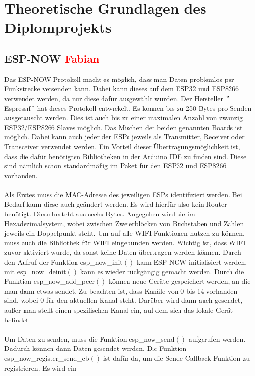 \documentclass[titlepage,12pt,twoside]{article}
\begin{document}
\section{Theoretische Grundlagen des Diplomprojekts}

\subsection{ESP-NOW \textcolor{red}{Fabian}}
Das ESP-NOW Protokoll macht es möglich, dass man Daten problemlos per 
Funkstrecke versenden kann. Dabei kann dieses auf dem ESP32 und ESP8266 
verwendet werden, da nur diese dafür ausgewählt wurden. Der Hersteller 
$"$Espressif$"$ hat dieses Protokoll entwickelt. Es können bis zu 250 Bytes 
pro Senden ausgetauscht werden. Dies ist auch bis zu einer maximalen Anzahl 
von zwanzig ESP32/ESP8266 Slaves möglich. Das Mischen der beiden genannten 
Boards ist möglich. Dabei kann auch jeder der ESPs jeweils als Transmitter, 
Receiver oder Transceiver verwendet werden. Ein Vorteil dieser Übertragungsmöglichkeit 
ist, dass die dafür benötigten Bibliotheken in der Arduino IDE zu finden 
sind. Diese sind nämlich schon standardmäßig im Paket für den ESP32 und 
ESP8266 vorhanden. \\
\\
Als Erstes muss die MAC-Adresse des jeweiligen ESPs identifiziert werden. 
Bei Bedarf kann diese auch geändert werden. Es wird hierfür also kein 
Router benötigt. Diese besteht aus sechs Bytes. Angegeben wird sie im 
Hexadezimalsystem, wobei zwischen Zweierblöcken von Buchstaben und Zahlen 
jeweils ein Doppelpunkt steht. Um auf alle WIFI-Funktionen nutzen zu können, 
muss auch die Bibliothek für WIFI eingebunden werden. Wichtig ist, dass WIFI 
zuvor aktiviert wurde, da sonst keine Daten übertragen werden können. Durch 
den Aufruf der Funktion esp\_now\_init$()$ kann ESP-NOW initialisiert werden, 
mit esp\_now\_deinit$()$ kann es wieder rückgängig gemacht werden. Durch die 
Funktion esp\_now\_add\_peer$()$ können neue Geräte gespeichert werden, an die 
man dann etwas sendet. Zu beachten ist, dass Kanäle von 0 bis 14 vorhanden 
sind, wobei 0 für den aktuellen Kanal steht. Darüber wird dann auch gesendet, 
außer man stellt einen spezifischen Kanal ein, auf dem sich das lokale Gerät 
befindet. \\
\\
Um Daten zu senden, muss die Funktion esp\_now\_send$()$ aufgerufen werden. 
Dadurch können dann Daten gesendet werden. Die Funktion esp\_now\_register\_send\_cb$()$ 
ist dafür da, um die Sende-Callback-Funktion zu registrieren. Es wird ein 
\end{document}
